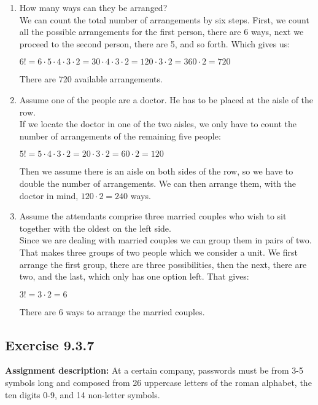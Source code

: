 \documentclass{report}
\newcommand{\cent}[1]{\begin{center}#1\end{center}}
\newcommand{\assignmentDescription}{\textbf{Assignment description: }}
\newcommand{\Exercise}[1]{\subsection{Exercise #1}}
\newcommand{\defaultEnumerateLabel}{\textbf{\alph*.}}
\newcommand{\myItem}[1]{\item #1\\}
\newcommand{\letterEnumeration}[1]{\begin{enumerate}[label = \defaultEnumerateLabel]
		#1
\end{enumerate}}
\begin{document}
 	\letterEnumeration{
 		\myItem{How many ways can they be arranged?}
 		We can count the total number of arrangements by six steps. First, we count all the possible arrangements for the first person, there are 6 ways, next we proceed to the second person, there are 5, and so forth. Which gives us:
 		
 		\cent{$6! = 6 \cdot 5 \cdot 4 \cdot 3 \cdot 2  = 30 \cdot 4 \cdot 3 \cdot 2  = 120 \cdot 3 \cdot 2 = 360 \cdot 2 = 720$}
 		
 		There are 720 available arrangements.\\
 		
 		\myItem{Assume one of the people are a doctor. He has to be placed at the aisle of the row.}
 		
 		If we locate the doctor in one of the two aisles, we only have to count the number of arrangements of the remaining five people:
 		
 		\cent{$5! = 5 \cdot 4 \cdot 3 \cdot 2 = 20 \cdot 3 \cdot 2 = 60 \cdot 2 = 120$}
 		
 		Then we assume there is an aisle on both sides of the row, so we have to double the number of arrangements. We can then arrange them, with the doctor in mind,  $120 \cdot 2 = 240$ ways.
 		
 		\myItem{Assume the attendants comprise three married couples who wish to sit together with the oldest on the left side.}
 		
 		Since we are dealing with married couples we can group them in pairs of two. That makes three groups of two people which we consider a unit. We first arrange the first group, there are three possibilities, then the next, there are two, and the last, which only has one option left. That gives:
 		
 		\cent{$3! = 3 \cdot  2 = 6$}
 		
 		There are 6 ways to arrange the married couples.\\		
 	}
 	
 	\Exercise{9.3.7}
 	\assignmentDescription
 	At a certain company, passwords must be from 3-5 symbols long and composed from 26 uppercase letters of the roman alphabet, the ten digits 0-9, and 14 non-letter symbols.\\
 	
\end{document}
